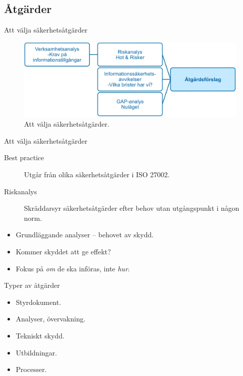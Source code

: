 \documentclass{beamer}
\begin{document}
\subsection{Åtgärder}
\begin{frame}{Att välja säkerhetsåtgärder}
  \begin{figure}
    \includegraphics[width=\textwidth]{msb-atgarder.png}
    \caption{Att välja säkerhetsåtgärder.}
  \end{figure}
\end{frame}
\begin{frame}{Att välja säkerhetsåtgärder}
  \begin{description}
    \item[Best practice] Utgår från olika säkerhetsåtgärder i ISO 27002.
    \item[Riskanalys] Skräddarsyr säkerhetsåtgärder efter behov utan 
      utgångspunkt i någon norm.
  \end{description}
  \begin{itemize}
    \item Grundläggande analyser -- behovet av skydd.
    \item Kommer skyddet att ge effekt?
    \item Fokus på \emph{om} de ska införas, inte \emph{hur}.
  \end{itemize}
\end{frame}
\begin{frame}{Typer av åtgärder}
  \begin{itemize}
    \item Styrdokument.
    \item Analyser, övervakning.
    \item Tekniskt skydd.
    \item Utbildningar.
    \item Processer.
  \end{itemize}
\end{frame}
\end{document}
